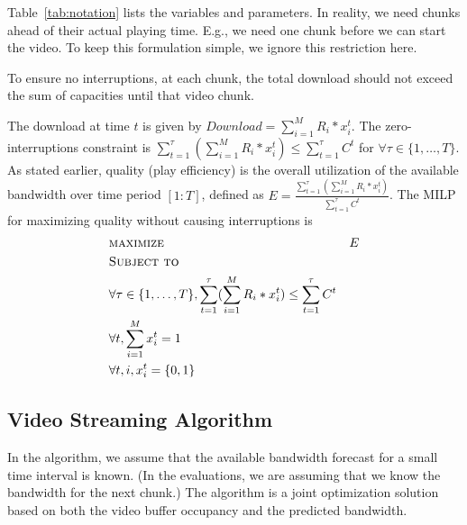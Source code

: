 Table~\ref{tab:notation} lists the variables and parameters.
In reality, we need chunks ahead of their actual playing
time. E.g., we need one chunk before we can start the video. To keep
this formulation simple, we ignore this restriction here.

To ensure  no interruptions, at each chunk, the total download
should not exceed the sum of capacities until that video chunk.



The download at time $t$ is given by 
$Download = \sum \limits_{i=1}^M R_i *  x_i^t$. 
The zero-interruptions constraint is 
$\sum \limits_{t=1}^\tau  (\sum \limits_{i=1}^M R_i *  x_i^t) \leq\sum\limits_{t=1}^\tau C^t$
for $\forall \tau \in \{1, \dots, T\}$.
As stated earlier, 
quality (play efficiency) 
is the overall utilization of the available bandwidth
over time period $[1:T]$, defined as
${E}=\frac{\sum\limits_{t=1}^\tau  (\sum \limits_{i=1}^M R_i *  x_i^t)}{\sum\limits_{t=1}^\tau C^t}$. 
The MILP for maximizing quality without causing interruptions is
\begin{subequations}
\begin{align*}
&\textsc{maximize }&{E}\\ 
&\textsc{Subject to}\\
&\forall \tau \in \{1, \dots, T\}, \sum \limits_{t=1}^\tau  (\sum \limits_{i=1}^M R_i *  x_i^t)
\leq\sum\limits_{t=1}^\tau C^t \\
& \forall t, \sum \limits_{i=1}^M x_i^t =1\ \\
& \forall t, i, x_i^t = \{0,1\}
\end{align*}
\end{subequations}

\subsection{Video Streaming Algorithm} \label{subsec:online}

In the algorithm, we assume that the available bandwidth forecast for
a small time interval is known.
(In the evaluations, we are assuming that we know the bandwidth for
the next chunk.)
The algorithm is a joint optimization
solution based on both the video buffer occupancy and the predicted bandwidth. 


